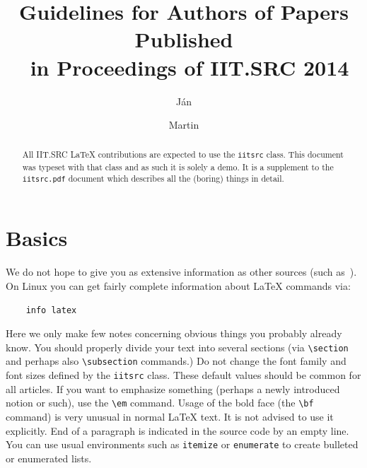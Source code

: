 \documentclass{iitsrc}
\title{Guidelines for Authors of Papers Published\\~in Proceedings of IIT.SRC 2014}
\author{Ján}{Novák}
\author{Martin}{Kováč}
\begin{document}
\begin{abstract}
All IIT.SRC \LaTeX{} contributions are expected to use the {\tt iitsrc}
class. This document was typeset with that class and as such it is
solely a demo. It is a supplement to the {\tt iitsrc.pdf} document which
describes all the (boring) things in detail.\footnotemark
\end{abstract}

\section{Basics}
%
%
We do not hope to give you as extensive information as other sources (such
as~\cite{lamport:latex}). On Linux you can get fairly complete
information about \LaTeX{} commands via:

\begin{verbatim}
    info latex
\end{verbatim}
Here we only make few notes concerning obvious things you probably
already know.
%
You should properly divide your text into several sections (via
\verb|\section| and perhaps also \verb|\subsection| commands.)
%
Do not change the font family and font sizes defined by the
\verb|iitsrc| class. These default values should be common for all
articles.
%
If you want to emphasize something (perhaps a newly introduced notion
or such), use the \verb|\em| command.
%
Usage of the bold face (the \verb|\bf| command) is very unusual in
normal \LaTeX{} text. It is not advised to use it explicitly.
%
End of a paragraph is indicated in the source code by an empty line.
%
You can use usual environments such as \verb|itemize| or
\verb|enumerate| to create bulleted or enumerated lists.
%
\end{document}
